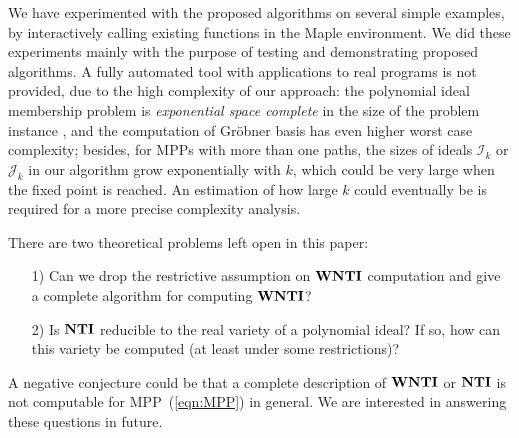 \documentclass{jssc}
\newcommand{\I}{\mathcal{I}}
\newcommand{\J}{\mathcal{J}}
\newcommand{\NTI}{{\bf NTI}}
\newcommand{\WNTI}{{\bf WNTI}}
\begin{document}
We have experimented with the proposed algorithms on several simple examples, by interactively calling existing functions in the {\sc Maple} environment. We did these experiments mainly with the purpose of testing and demonstrating proposed algorithms. A fully automated tool with applications to real programs is not provided, due to the high complexity of our approach: the polynomial ideal membership problem is \emph{exponential space complete} in the size of the problem instance \cite{mayr:EXPSC}, and the computation of Gr\"obner basis has even higher worst case complexity; besides, for MPPs with more than one paths, the sizes of ideals $\I_k$ or $\J_k$ in our algorithm grow exponentially with $k$, which could be very large when the fixed point is reached. An estimation of how large $k$ could eventually be is required for a more precise complexity analysis.

There are two theoretical problems left open in this paper:
\begin{enumerate}
\item[1)] Can we drop the restrictive assumption on $\WNTI$ computation and give a complete algorithm for computing $\WNTI$?
\item[2)] Is $\NTI$ reducible to the real variety of a polynomial ideal? If so, how can this variety be computed (at least under some restrictions)?
\end{enumerate}
A negative conjecture could be that a complete description of $\WNTI$ or $\NTI$ is not computable for MPP~(\ref{eqn:MPP}) in general. We are interested in answering these questions in future.






\end{document}
